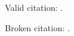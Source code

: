 \documentclass{article}
\begin{document}
Valid citation: \cite{known}.

Broken citation: \cite{missing}.
\end{document}
